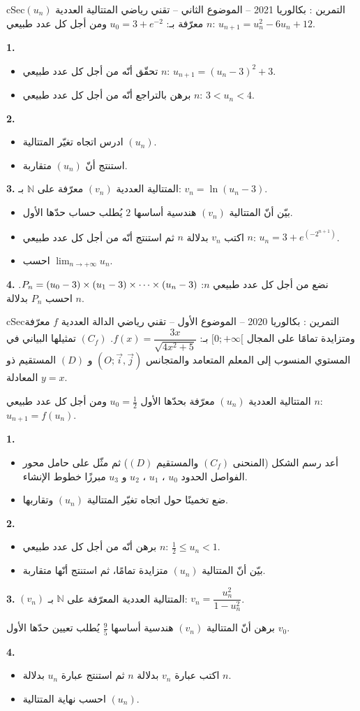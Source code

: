 \documentclass[12pt,a4paper]{article}
\newenvironment{BOX}[2]{\begin{otherlanguage}{english}\begin{arbox}{#1}{#2}}{\end{arbox}\end{otherlanguage}}
\newcounter{exo}
\newenvironment{tamrin}[1]{\stepcounter{exo}\begin{BOX}{cSec}{التمرين \theexo: #1}}{\end{BOX}}
\renewcommand{\cdots}{\mathinner{\cdotp\cdotp\cdotp}}
\newcommand{\N}{\mathbb{N}}
\newcommand{\limn}{\displaystyle\lim_{n\to+\infty}}
\newenvironment{sq}{\begin{itemize}[leftmargin=2.4em,itemsep=3pt]}{\end{itemize}}
\newcommand{\qa}{\item[(أ)]}\newcommand{\qb}{\item[(ب)]}\newcommand{\qc}{\item[(جـ)]}\newcommand{\qd}{\item[(د)]}\newcommand{\qe}{\item[(هـ)]}
\begin{document}
\begin{tamrin}{بكالوريا 2021 -- الموضوع الثاني -- تقني رياضي}
المتتالية العددية $(u_n)$ معرّفة بـ: $u_0=3+e^{-2}$ ومن أجل كل عدد طبيعي $n$: $u_{n+1}=u_n^2-6u_n+12$.

\textbf{1.}
\begin{sq}
\qa تحقّق أنّه من أجل كل عدد طبيعي $n$: $u_{n+1}=\left(u_n-3\right)^2+3$.
\qb برهن بالتراجع أنّه من أجل كل عدد طبيعي $n$: $3<u_n<4$.
\end{sq}
\textbf{2.}
\begin{sq}
\qa ادرس اتجاه تغيّر المتتالية $(u_n)$.
\qb استنتج أنّ $(u_n)$ متقاربة.
\end{sq}
\textbf{3.} المتتالية العددية $(v_n)$ معرّفة على $\N$ بـ: $v_n=\ln\left(u_n-3\right)$.
\begin{sq}
\qa بيّن أنّ المتتالية $(v_n)$ هندسية أساسها $2$ يُطلب حساب حدّها الأول.
\qb اكتب $v_n$ بدلالة $n$ ثم استنتج أنّه من أجل كل عدد طبيعي $n$: $u_n=3+e^{\left(-2^{n+1}\right)}$.
\qc احسب $\limn u_n$.
\end{sq}
\textbf{4.} نضع من أجل كل عدد طبيعي $n$: $P_n=\left(u_0-3\right)\times\left(u_1-3\right)\times\cdots\times\left(u_n-3\right)$. احسب $P_n$ بدلالة $n$.
\end{tamrin}

\begin{tamrin}{بكالوريا 2020 -- الموضوع الأول -- تقني رياضي}
الدالة العددية $f$ معرّفة ومتزايدة تمامًا على المجال $[0;+\infty[$ بـ: $f(x)=\dfrac{3x}{\sqrt{4x^2+5}}$. $(C_f)$ تمثيلها البياني في المستوي المنسوب إلى المعلم المتعامد والمتجانس $\left(O;\vec i,\vec j\right)$ و $(D)$ المستقيم ذو المعادلة $y=x$.

المتتالية العددية $(u_n)$ معرّفة بحدّها الأول $u_0=\frac12$ ومن أجل كل عدد طبيعي $n$: $u_{n+1}=f(u_n)$.

\textbf{1.}
\begin{sq}
\qa أعد رسم الشكل (المنحنى $(C_f)$ والمستقيم $(D)$) ثم مثّل على حامل محور الفواصل الحدود $u_0$ ، $u_1$ ، $u_2$ و $u_3$ مبرزًا خطوط الإنشاء.
\qb ضع تخمينًا حول اتجاه تغيّر المتتالية $(u_n)$ وتقاربها.
\end{sq}
\textbf{2.}
\begin{sq}
\qa برهن أنّه من أجل كل عدد طبيعي $n$: $\frac12\le u_n<1$.
\qb بيّن أنّ المتتالية $(u_n)$ متزايدة تمامًا، ثم استنتج أنّها متقاربة.
\end{sq}
\textbf{3.} $(v_n)$ المتتالية العددية المعرّفة على $\N$ بـ: $v_n=\dfrac{u_n^2}{1-u_n^2}$.

برهن أنّ المتتالية $(v_n)$ هندسية أساسها $\frac95$ يُطلب تعيين حدّها الأول $v_0$.

\textbf{4.}
\begin{sq}
\qa اكتب عبارة $v_n$ بدلالة $n$ ثم استنتج عبارة $u_n$ بدلالة $n$.
\qb احسب نهاية المتتالية $(u_n)$.
\end{sq}
\end{tamrin}
\end{document}
